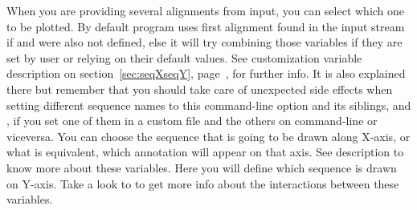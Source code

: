    { {\tbdef} }
%
   { {\tbdef} }
%
   { {\tbdef} }
%
   { {\tbdef} }
%
   { {\tbdef} }
%
   { {\tbdef} }
%
   { {\tbdef} }
%
   { When you are providing several alignments from input, you can select which one to be plotted. By default program uses first alignment found in the input stream if  and  were also not defined, else it will try combining those variables if they are set by user or relying on their default values. See  customization variable description on section~\ref{sec:seqXseqY}, page~\pageref{sec:seqXseqY}, for further info. It is also explained there but remember that you should take care of unexpected side effects when setting different sequence names to this command-line option and its siblings,  and , if you set one of them in a custom file and the others on command-line or viceversa. }
%
   { You can choose the sequence that is going to be drawn along X-axis, or what is equivalent, which annotation will appear on that axis. See  description to know more about these variables. }
%
   { Here you will define which sequence is drawn on Y-axis. Take a look to  to get more info about the interactions between these variables. }
%
